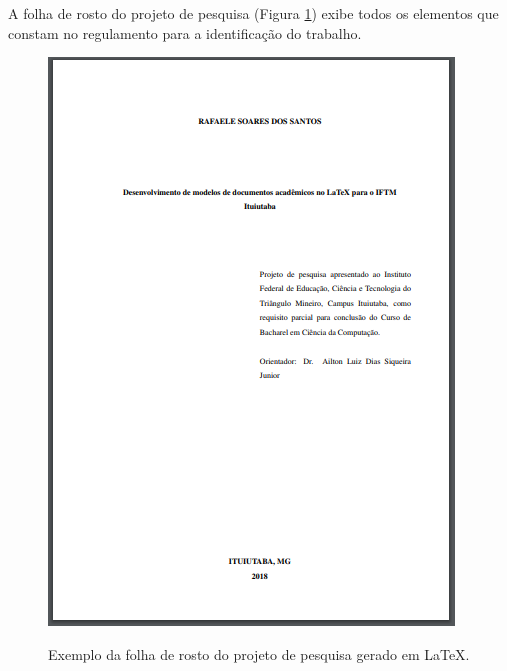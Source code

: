 \newpage
A folha de rosto do projeto de pesquisa (Figura \ref{folharostoproj}) exibe todos os elementos que constam no regulamento para a identificação do trabalho.\\
\begin{figure}[h]
	\centering
	\includegraphics{imagens/projetoPesq/FolhaRosto.png}\\
	\caption{Exemplo da folha de rosto do projeto de pesquisa gerado em LaTeX.}
	\label{folharostoproj}
\end{figure}

